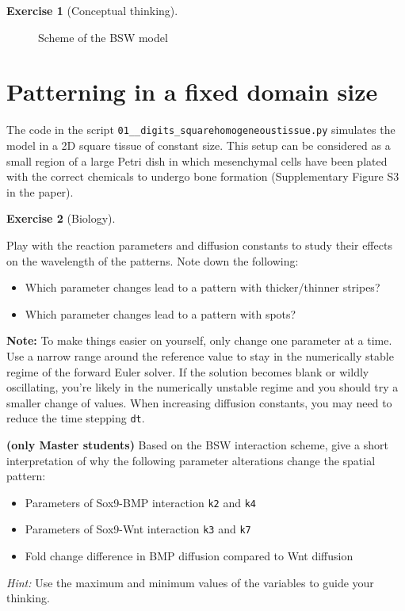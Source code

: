 \documentclass[
  letterpaper,
  DIV=11,
  numbers=noendperiod]{scrreprt}
\providecommand{\tightlist}{%
  \setlength{\itemsep}{0pt}\setlength{\parskip}{0pt}}\usepackage{longtable,booktabs,array}
\theoremstyle{definition}
\newtheorem{exercise}{Exercise}[chapter]
\theoremstyle{remark}
\begin{document}
\begin{exercise}[Conceptual
thinking]
\begin{figure}
{}

\caption{\label{fig-wntbmpsox}Scheme of the BSW model}

\end{figure}%

\end{exercise}

\section{Patterning in a fixed domain
size}\label{patterning-in-a-fixed-domain-size}

The code in the script \texttt{01\_\_digits\_squarehomogeneoustissue.py}
simulates the model in a 2D square tissue of constant size. This setup
can be considered as a small region of a large Petri dish in which
mesenchymal cells have been plated with the correct chemicals to undergo
bone formation (Supplementary Figure S3 in the paper).

\begin{exercise}[Biology]\protect\hypertarget{exr-tur}{}\label{exr-tur}

Play with the reaction parameters and diffusion constants to study their
effects on the wavelength of the patterns. Note down the following:

\begin{itemize}
\tightlist
\item
  Which parameter changes lead to a pattern with thicker/thinner
  stripes?
\item
  Which parameter changes lead to a pattern with spots?
\end{itemize}

\textbf{Note:} To make things easier on yourself, only change one
parameter at a time. Use a narrow range around the reference value to
stay in the numerically stable regime of the forward Euler solver. If
the solution becomes blank or wildly oscillating, you're likely in the
numerically unstable regime and you should try a smaller change of
values. When increasing diffusion constants, you may need to reduce the
time stepping \texttt{dt}.

\textbf{(only Master students)} Based on the BSW interaction scheme,
give a short interpretation of why the following parameter alterations
change the spatial pattern:

\begin{itemize}
\tightlist
\item
  Parameters of Sox9-BMP interaction \texttt{k2} and \texttt{k4}
\item
  Parameters of Sox9-Wnt interaction \texttt{k3} and \texttt{k7}
\item
  Fold change difference in BMP diffusion compared to Wnt diffusion
\end{itemize}

\emph{Hint:} Use the maximum and minimum values of the variables to
guide your thinking.

\end{exercise}
\end{document}
